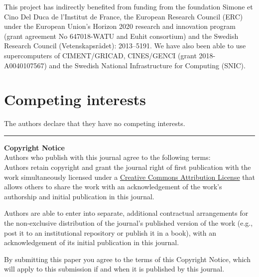 
This project has indirectly benefited from funding from the foundation Simone et
Cino Del Duca de l'Institut de France, the European Research Council (ERC)
under the European Union's Horizon 2020 research and innovation program (grant
agreement No 647018-WATU and Euhit consortium) and the Swedish Research Council
(Vetenskapsr{\aa}det): 2013--5191.
%
We have also been able to use supercomputers of CIMENT/GRICAD, CINES/GENCI
(grant 2018-A0040107567) and the Swedish National Infrastructure for Computing
(SNIC).

\section{Competing interests}


The authors declare that they have no competing interests.



\rule{\textwidth}{1pt}

{\bf Copyright Notice} \\
Authors who publish with this journal agree to the following terms: \\

Authors retain copyright and grant the journal right of first publication with
the work simultaneously licensed under a
\href{http://creativecommons.org/licenses/by/3.0/}{Creative Commons Attribution
License} that allows others to share the work with an acknowledgement of the
work's authorship and initial publication in this journal.

Authors are able to enter into separate, additional contractual arrangements
for the non-exclusive distribution of the journal's published version of the
work (e.g., post it to an institutional repository or publish it in a book),
with an acknowledgement of its initial publication in this journal.

By submitting this paper you agree to the terms of this Copyright Notice, which
will apply to this submission if and when it is published by this journal.

